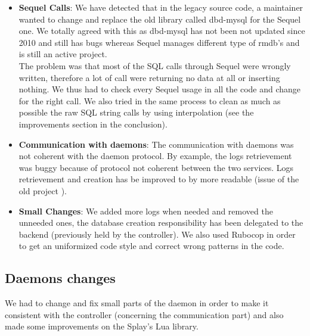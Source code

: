 \documentclass{eplmastersthesis}
\begin{document}
        \begin{itemize}
          \item \textbf{Sequel Calls}: We have detected that in the legacy
          source code, a maintainer wanted to change and replace the old library
          called dbd-mysql \cite{dbdMysql} for the Sequel \cite{Sequel} one. We
          totally agreed with this as dbd-mysql has not been not updated since
          2010 and still has bugs whereas Sequel manages different type of
          rmdb's and is still an active project.\\
          The problem was that most of the SQL calls through Sequel were wrongly
          written, therefore a lot of call were returning no data at all or
          inserting nothing. We thus had to check every Sequel usage in all the
          code and change for the right call. We also tried in the same process
          to clean as much as possible the raw SQL string calls by using
          interpolation (see the improvements section in the conclusion).
          \item \textbf{Communication with daemons}: The communication with
          daemons was not coherent with the daemon protocol. By example, the
          logs retrievement was buggy because of protocol not coherent between
          the two services. Logs retrievement and creation has be improved to by
          more readable (issue of the old project \cite{logTimestamps}). %
          \item \textbf{Small Changes}: We added more logs when needed and
          removed the unneeded ones, the database creation responsibility has
          been delegated to the backend (previously held by the controller). We
          also used Rubocop \cite{Rubocop} in order to get an uniformized code
          style and correct wrong patterns in the code.
        \end{itemize}

      \subsection{Daemons changes}

        We had to change and fix small parts of the daemon in order to make
        it consistent with the controller (concerning the communication part)
        and also made some improvements on the Splay's Lua library.
\end{document}
